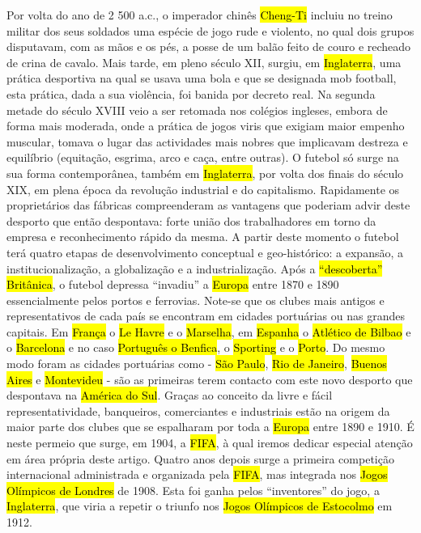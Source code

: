 \documentclass[a4paper,12pt]{article}
\begin{document}
Por volta do ano de 2 500 a.c., o imperador chinês \hl{Cheng-Ti} incluiu no treino militar dos seus soldados uma espécie de jogo rude e violento, no qual dois grupos disputavam, com as mãos e os pés, a posse de um balão feito de couro e recheado de crina de cavalo.
 Mais tarde, em pleno século XII, surgiu, em \hl{Inglaterra}, uma prática desportiva na qual se usava uma bola e que se designada mob football, esta prática, dada a sua violência, foi banida por decreto real. Na segunda metade do século XVIII veio a ser retomada nos colégios ingleses, embora de forma mais moderada, onde a prática de jogos viris que exigiam maior empenho muscular, tomava o lugar das actividades mais nobres que implicavam destreza e equilíbrio (equitação, esgrima, arco e caça, entre outras).
 O futebol só surge na sua forma contemporânea, também em \hl{Inglaterra}, por volta dos finais do século XIX, em plena época da revolução industrial e do capitalismo.
Rapidamente os proprietários das fábricas compreenderam as vantagens que poderiam advir deste desporto que então despontava: forte união dos trabalhadores em torno da empresa e reconhecimento rápido da mesma. A partir deste momento o futebol terá quatro etapas de desenvolvimento conceptual e geo-histórico: a expansão, a institucionalização, a globalização e a industrialização.
 Após a \hl{“descoberta”} \hl{Britânica}, o futebol depressa “invadiu” a \hl{Europa} entre 1870 e 1890 essencialmente pelos portos e ferrovias. Note-se que os clubes mais antigos e
 representativos de cada país se encontram em cidades portuárias ou nas grandes capitais. Em \hl{França} o \hl{Le Havre} e o \hl{Marselha}, em \hl{Espanha} o \hl{Atlético de Bilbao} e o \hl{Barcelona} e no caso \hl{Português o Benfica}, o \hl{Sporting} e o \hl{Porto}. Do mesmo modo foram as cidades portuárias como - \hl{São Paulo}, \hl{Rio de Janeiro}, \hl{Buenos Aires} e \hl{Montevideu} - são as primeiras terem contacto com este novo desporto que despontava na \hl{América do Sul}.
 Graças ao conceito da livre e fácil representatividade, banqueiros, comerciantes e industriais estão na origem da maior parte dos clubes que se espalharam por toda a \hl{Europa} entre 1890 e 1910. É neste permeio que surge, em 1904, a \hl{FIFA}, à qual iremos dedicar especial atenção em área própria deste artigo. Quatro anos depois surge a primeira competição internacional administrada e organizada pela \hl{FIFA}, mas integrada nos \hl{Jogos Olímpicos de Londres} de 1908. Esta foi ganha pelos “inventores” do jogo, a \hl{Inglaterra}, que viria a repetir o triunfo nos \hl{Jogos Olímpicos de Estocolmo} em 1912.
\end{document}
